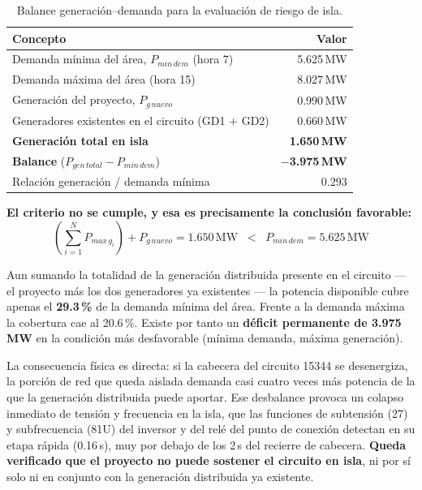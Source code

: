 \documentclass[11pt,a4paper]{article}
\begin{document}
\begin{table}[H]
\centering
\caption{Balance generaci\'on--demanda para la evaluaci\'on de riesgo de isla.}
\begin{tabular}{lr}
\toprule
Concepto & Valor \\
\midrule
Demanda m\'inima del \'area, $P_{min\,dem}$ (hora 7) & 5.625\,MW \\
Demanda m\'axima del \'area (hora 15) & 8.027\,MW \\
\midrule
Generaci\'on del proyecto, $P_{g\,nuevo}$ & 0.990\,MW \\
Generadores existentes en el circuito (GD1 $+$ GD2) & 0.660\,MW \\
\textbf{Generaci\'on total en isla} & \textbf{1.650\,MW} \\
\midrule
\textbf{Balance} ($P_{gen\,total} - P_{min\,dem}$) & \textbf{$-$3.975\,MW} \\
Relaci\'on generaci\'on / demanda m\'inima & 0.293 \\
\bottomrule
\end{tabular}
\end{table}

\textbf{El criterio no se cumple, y esa es precisamente la conclusi\'on favorable:}
\[
\left(\sum_{i=1}^{N} P_{max\,g_i}\right) + P_{g\,nuevo} = 1.650\,\text{MW} \;\; < \;\; P_{min\,dem} = 5.625\,\text{MW}
\]

Aun sumando la totalidad de la generaci\'on distribuida presente en el circuito --- el proyecto m\'as los dos generadores ya existentes --- la potencia disponible cubre apenas el \textbf{29.3\,\%} de la demanda m\'inima del \'area. Frente a la demanda m\'axima la cobertura cae al 20.6\,\%. Existe por tanto un \textbf{d\'eficit permanente de 3.975\,MW} en la condici\'on m\'as desfavorable (m\'inima demanda, m\'axima generaci\'on).

La consecuencia f\'isica es directa: si la cabecera del circuito 15344 se desenergiza, la porci\'on de red que queda aislada demanda casi cuatro veces m\'as potencia de la que la generaci\'on distribuida puede aportar. Ese desbalance provoca un colapso inmediato de tensi\'on y frecuencia en la isla, que las funciones de subtensi\'on (27) y subfrecuencia (81U) del inversor y del rel\'e del punto de conexi\'on detectan en su etapa r\'apida (0.16\,s), muy por debajo de los 2\,s del recierre de cabecera. \textbf{Queda verificado que el proyecto no puede sostener el circuito en isla}, ni por s\'i solo ni en conjunto con la generaci\'on distribuida ya existente.
\end{document}
